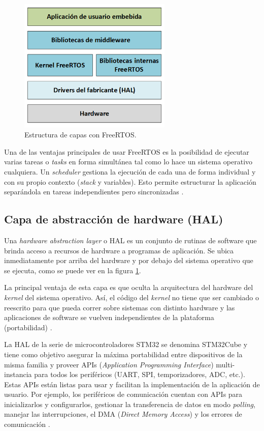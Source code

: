 \begin{figure}[H]
\centering
\includegraphics[width=0.65\textwidth]{./Figures/capas.png}
\caption{Estructura de capas con FreeRTOS.}
\label{fig:capas}
\end{figure}

Una de las ventajas principales de usar FreeRTOS es la posibilidad de ejecutar varias tareas o \textit{tasks} en forma simultánea tal como lo hace un sistema operativo cualquiera. Un \textit{scheduler} gestiona la ejecución de cada una de forma individual y con su propio contexto (\textit{stack} y variables). Esto permite estructurar la aplicación separándola en tareas independientes pero sincronizadas \citep{WEBSITE:FREERTOS}.

\subsection{Capa de abstracción de hardware (HAL)}

Una \textit{hardware abstraction layer} o HAL es un conjunto de rutinas de software que brinda acceso a recursos de hardware a programas de aplicación. Se ubica inmediatamente por arriba del hardware y por debajo del sistema operativo que se ejecuta, como se puede ver en la figura \ref{fig:capas}.

La principal ventaja de esta capa es que oculta la arquitectura del hardware del \textit{kernel} del sistema operativo. Así, el código del \textit{kernel} no tiene que ser cambiado o reescrito para que pueda correr sobre sistemas con distinto hardware y las aplicaciones de software se vuelven independientes de la plataforma (portabilidad) \citep{WEBSITE:HAL}.

La HAL de la serie de microcontroladores STM32 se denomina STM32Cube y tiene como objetivo asegurar la máxima portabilidad entre dispositivos de la misma familia y proveer APIs (\textit{Application Programming Interface}) multi-instancia para todos los periféricos (UART, SPI, temporizadores, ADC, etc.). Estas APIs están listas para usar y facilitan la implementación de la aplicación de usuario. Por ejemplo, los periféricos de comunicación cuentan con APIs para inicializarlos y configurarlos, gestionar la transferencia de datos en modo \textit{polling}, manejar las interrupciones, el DMA (\textit{Direct Memory Access}) y los errores de comunicación \citep{WEBSITE:STM32CUBE}.

